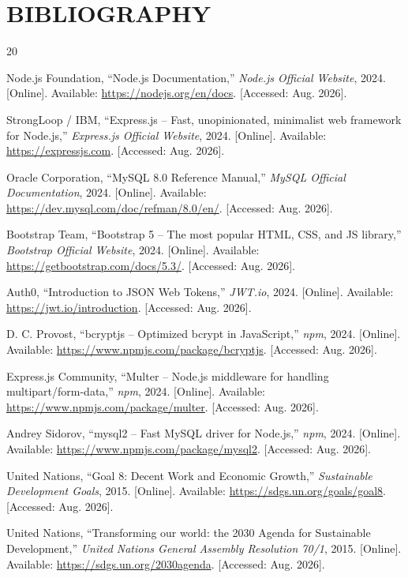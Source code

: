 \chapter{BIBLIOGRAPHY}

\begin{thebibliography}{20}

Node.js Foundation, ``Node.js Documentation,'' \textit{Node.js Official Website}, 2024. [Online]. Available: \url{https://nodejs.org/en/docs}. [Accessed: Aug. 2026].

StrongLoop / IBM, ``Express.js -- Fast, unopinionated, minimalist web framework for Node.js,'' \textit{Express.js Official Website}, 2024. [Online]. Available: \url{https://expressjs.com}. [Accessed: Aug. 2026].

Oracle Corporation, ``MySQL 8.0 Reference Manual,'' \textit{MySQL Official Documentation}, 2024. [Online]. Available: \url{https://dev.mysql.com/doc/refman/8.0/en/}. [Accessed: Aug. 2026].

Bootstrap Team, ``Bootstrap 5 -- The most popular HTML, CSS, and JS library,'' \textit{Bootstrap Official Website}, 2024. [Online]. Available: \url{https://getbootstrap.com/docs/5.3/}. [Accessed: Aug. 2026].

Auth0, ``Introduction to JSON Web Tokens,'' \textit{JWT.io}, 2024. [Online]. Available: \url{https://jwt.io/introduction}. [Accessed: Aug. 2026].

D. C. Provost, ``bcryptjs -- Optimized bcrypt in JavaScript,'' \textit{npm}, 2024. [Online]. Available: \url{https://www.npmjs.com/package/bcryptjs}. [Accessed: Aug. 2026].

Express.js Community, ``Multer -- Node.js middleware for handling multipart/form-data,'' \textit{npm}, 2024. [Online]. Available: \url{https://www.npmjs.com/package/multer}. [Accessed: Aug. 2026].

Andrey Sidorov, ``mysql2 -- Fast MySQL driver for Node.js,'' \textit{npm}, 2024. [Online]. Available: \url{https://www.npmjs.com/package/mysql2}. [Accessed: Aug. 2026].

United Nations, ``Goal 8: Decent Work and Economic Growth,'' \textit{Sustainable Development Goals}, 2015. [Online]. Available: \url{https://sdgs.un.org/goals/goal8}. [Accessed: Aug. 2026].

United Nations, ``Transforming our world: the 2030 Agenda for Sustainable Development,'' \textit{United Nations General Assembly Resolution 70/1}, 2015. [Online]. Available: \url{https://sdgs.un.org/2030agenda}. [Accessed: Aug. 2026].


\end{thebibliography}
